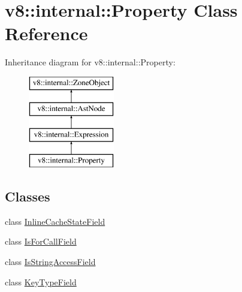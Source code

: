 \hypertarget{classv8_1_1internal_1_1_property}{}\section{v8\+:\+:internal\+:\+:Property Class Reference}
\label{classv8_1_1internal_1_1_property}
Inheritance diagram for v8\+:\+:internal\+:\+:Property\+:\begin{figure}[H]
\begin{center}
\leavevmode
\includegraphics[height=4.000000cm]{classv8_1_1internal_1_1_property}
\end{center}
\end{figure}
\subsection*{Classes}
\begin{DoxyCompactItemize}
\item 
class \hyperlink{classv8_1_1internal_1_1_property_1_1_inline_cache_state_field}{Inline\+Cache\+State\+Field}
\item 
class \hyperlink{classv8_1_1internal_1_1_property_1_1_is_for_call_field}{Is\+For\+Call\+Field}
\item 
class \hyperlink{classv8_1_1internal_1_1_property_1_1_is_string_access_field}{Is\+String\+Access\+Field}
\item 
class \hyperlink{classv8_1_1internal_1_1_property_1_1_key_type_field}{Key\+Type\+Field}
\end{DoxyCompactItemize}
